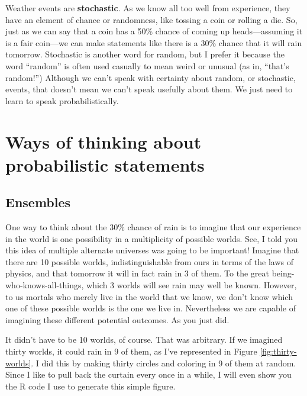 \documentclass[openany]{book}
\begin{document}
Weather events are \textbf{stochastic}. As we know all too well from experience, they have an element of chance or randomness, like tossing a coin or rolling a die. So, just as we can say that a coin has a 50\% chance of coming up heads---assuming it is a fair coin---we can make statements like there is a 30\% chance that it will rain tomorrow. Stochastic is another word for random, but I prefer it because the word ``random'' is often used casually to mean weird or unusual (as in, ``that's random!'') Although we can't speak with certainty about random, or stochastic, events, that doesn't mean we can't speak usefully about them. We just need to learn to speak probabilistically.

\hypertarget{ways-of-thinking-about-probabilistic-statements}{%
\section*{Ways of thinking about probabilistic statements}\label{ways-of-thinking-about-probabilistic-statements}}

\hypertarget{ensembles}{%
\subsection*{Ensembles}\label{ensembles}}

One way to think about the 30\% chance of rain is to imagine that our experience in the world is one possibility in a multiplicity of possible worlds. See, I told you this idea of multiple alternate universes was going to be important! Imagine that there are 10 possible worlds, indistinguishable from ours in terms of the laws of physics, and that tomorrow it will in fact rain in 3 of them. To the great being-who-knows-all-things, which 3 worlds will see rain may well be known. However, to us mortals who merely live in the world that we know, we don't know which one of these possible worlds is the one we live in. Nevertheless we are capable of imagining these different potential outcomes. As you just did.

It didn't have to be 10 worlds, of course. That was arbitrary. If we imagined thirty worlds, it could rain in 9 of them, as I've represented in Figure \ref{fig:thirty-worlds}. I did this by making thirty circles and coloring in 9 of them at random. Since I like to pull back the curtain every once in a while, I will even show you the R code I use to generate this simple figure.
\end{document}
